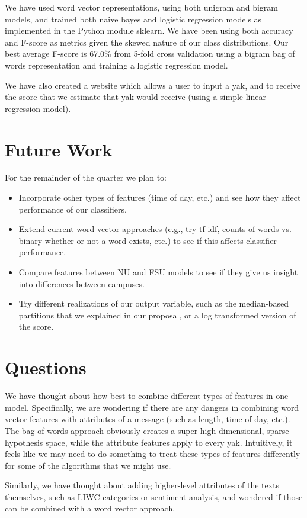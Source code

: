 \documentclass{sigchi}
\begin{document}
We have used word vector representations, using both unigram and bigram models,
and trained both naive bayes and logistic regression models as implemented in
the Python module sklearn. We have been using both accuracy and F-score as
metrics given the skewed nature of our class distributions. Our best average
F-score is 67.0\% from 5-fold cross validation using a bigram bag of words
representation and training a logistic regression model.

We have also created a website which allows a user to input a yak, and to
receive the score that we estimate that yak would receive (using a simple linear
regression model).

\section{Future Work}

For the remainder of the quarter we plan to:

\begin{itemize}
\item Incorporate other types of features (time of day, etc.) and see how they
affect performance of our classifiers.

\item Extend current word vector approaches (e.g., try tf-idf, counts of words
vs. binary whether or not a word exists, etc.) to see if this affects classifier
performance.

\item Compare features between NU and FSU models to see if they give us
insight into differences between campuses.

\item Try different realizations of our output variable, such as the
median-based partitions that we explained in our proposal, or a log transformed
version of the score.

\end{itemize}

\section{Questions}

We have thought about how best to combine different types of features in one
model. Specifically, we are wondering if there are any dangers in combining word
vector features with attributes of a message (such as length, time of day,
etc.). The bag of words approach obviously creates a super high dimensional,
sparse hypothesis space, while the attribute features apply to every yak.
Intuitively, it feels like we may need to do something to treat these types of
features differently for some of the algorithms that we might use.

Similarly, we have thought about adding higher-level attributes of the texts
themselves, such as LIWC categories or sentiment analysis, and wondered if those
can be combined with a word vector approach.


%  
\end{document}
